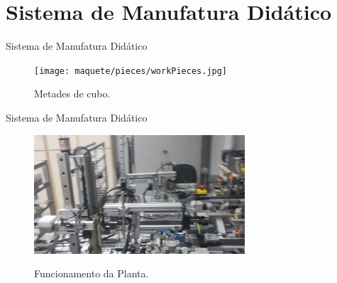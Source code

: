 \section{Sistema de Manufatura Didático}

\begin{frame}{Sistema de Manufatura Didático}
\begin{figure}[H]
  \centering
  \texttt{[image: maquete/pieces/workPieces.jpg]}
  \caption{Metades de cubo.}
  \label{fig:cubeHalves}
\end{figure}
\end{frame}

\begin{frame}{Sistema de Manufatura Didático}
\centering
   \begin{figure}[ht]
\href{run:../../videos/timelapse.avi?start=75&stop=85}{\includegraphics[width=0.7\textwidth]{../../videos/TCCVIDEO_cycle.jpg}}
  \caption{Funcionamento da Planta.}
   \end{figure}
\end{frame}

